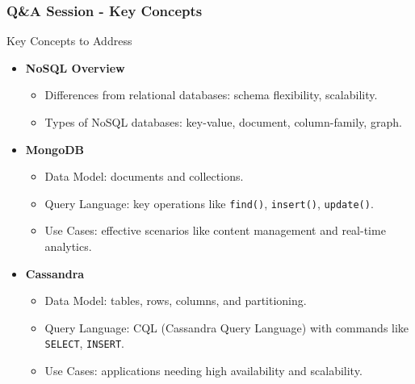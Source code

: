 \documentclass[aspectratio=169]{beamer}
\begin{document}
\begin{frame}[fragile]
    \frametitle{Q\&A Session - Key Concepts}
    \begin{block}{Key Concepts to Address}
        \begin{itemize}
            \item \textbf{NoSQL Overview}
                \begin{itemize}
                    \item Differences from relational databases: schema flexibility, scalability.
                    \item Types of NoSQL databases: key-value, document, column-family, graph.
                \end{itemize}
            \item \textbf{MongoDB}
                \begin{itemize}
                    \item Data Model: documents and collections.
                    \item Query Language: key operations like \texttt{find()}, \texttt{insert()}, \texttt{update()}.
                    \item Use Cases: effective scenarios like content management and real-time analytics.
                \end{itemize}
            \item \textbf{Cassandra}
                \begin{itemize}
                    \item Data Model: tables, rows, columns, and partitioning.
                    \item Query Language: CQL (Cassandra Query Language) with commands like \texttt{SELECT}, \texttt{INSERT}.
                    \item Use Cases: applications needing high availability and scalability.
                \end{itemize}
        \end{itemize}
    \end{block}
\end{frame}
\end{document}
